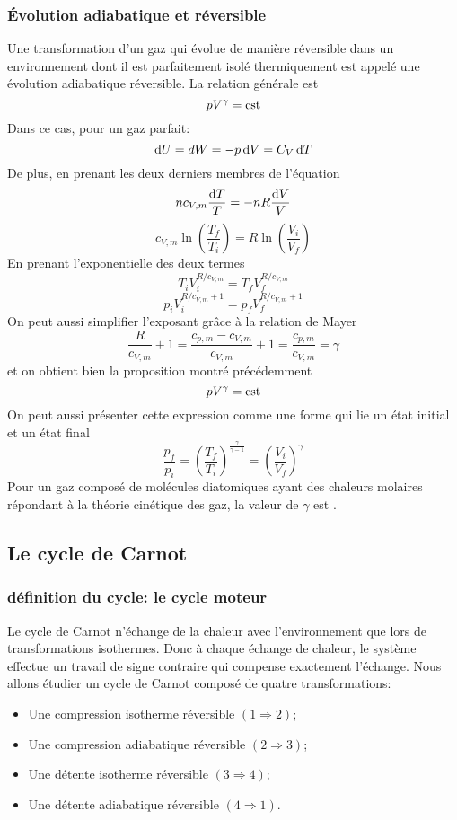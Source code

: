 \subsubsection{Évolution adiabatique et réversible}
Une transformation d'un gaz qui évolue de manière réversible dans
un environnement dont il est parfaitement isolé thermiquement est
appelé une évolution adiabatique réversible.
La relation générale est
\[ pV^{\gamma} = \mathrm{cst} \]
Dans ce cas, pour un gaz parfait:
\[ \operatorname{d}\! U = dW = -p\operatorname{d}\! V = C_V\operatorname{d}\! T \]
De plus, en prenant les deux derniers membres de l'équation
\[ nc_{V,m}\frac{\operatorname{d}\! T}{T} = -nR\frac{\operatorname{d}\! V}{V} \]
\[ c_{V,m} \ln \left(\frac{T_f}{T_i}\right) =
R \ln\left(\frac{V_i}{V_f}\right) \]
En prenant l'exponentielle des deux termes
\[ T_iV_i^{R/c_{V,m}} = T_fV_f^{R/c_{V,m}} \]
\[ p_iV_i^{R/c_{V,m}+1} = p_fV_f^{R/c_{V,m}+1} \]
On peut aussi simplifier l'exposant grâce à la relation de Mayer
\[ \frac{R}{c_{V,m}}+1 = \frac{c_{p,m}-c_{V,m}}{c_{V,m}}+1 =
\frac{c_{p,m}}{c_{V,m}} = \gamma \]
et on obtient bien la proposition montré précédemment
\[ pV^{\gamma} = \mathrm{cst} \]
On peut aussi présenter cette expression comme
une forme qui lie un état initial et un état final
\[ \frac{p_f}{p_i} = \left(\frac{T_f}{T_i}\right)^{\frac{\gamma}{\gamma -1}} =
\left(\frac{V_i}{V_f}\right)^{\gamma} \]
Pour un gaz composé de molécules diatomiques ayant des chaleurs molaires
répondant à la théorie cinétique des gaz,
la valeur de $\gamma$ est .

\subsection{Le cycle de Carnot}
\subsubsection{définition du cycle: le cycle moteur}
Le cycle de Carnot n'échange de la chaleur avec
l'environnement que lors de transformations isothermes.
Donc à chaque échange de chaleur, le système effectue
un travail de signe contraire qui compense exactement l'échange.
Nous allons étudier un cycle de Carnot composé de quatre transformations:
\begin{itemize}
  \item Une compression isotherme réversible $(1 \Rightarrow 2)$;
  \item Une compression adiabatique réversible $(2 \Rightarrow 3)$;
  \item Une détente isotherme réversible $( 3 \Rightarrow 4)$;
  \item Une détente adiabatique réversible $( 4 \Rightarrow 1)$.
\end{itemize}

